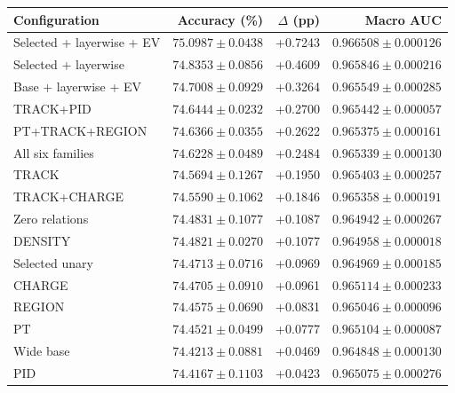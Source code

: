 \begin{table}[htbp]
\centering
\footnotesize
\setlength{\tabcolsep}{4pt}
\begin{tabularx}{\linewidth}{@{}Xrrr@{}}
\toprule
Configuration & Accuracy (\%) & $\Delta$ (pp) & Macro AUC \\
\midrule
Selected + layerwise + EV & $75.0987 \pm 0.0438$ & +0.7243 & $0.966508 \pm 0.000126$ \\ %
Selected + layerwise & $74.8353 \pm 0.0856$ & +0.4609 & $0.965846 \pm 0.000216$ \\ %
Base + layerwise + EV & $74.7008 \pm 0.0929$ & +0.3264 & $0.965549 \pm 0.000285$ \\ %
TRACK+PID & $74.6444 \pm 0.0232$ & +0.2700 & $0.965442 \pm 0.000057$ \\ %
PT+TRACK+REGION & $74.6366 \pm 0.0355$ & +0.2622 & $0.965375 \pm 0.000161$ \\ %
All six families & $74.6228 \pm 0.0489$ & +0.2484 & $0.965339 \pm 0.000130$ \\ %
TRACK & $74.5694 \pm 0.1267$ & +0.1950 & $0.965403 \pm 0.000257$ \\ %
TRACK+CHARGE & $74.5590 \pm 0.1062$ & +0.1846 & $0.965358 \pm 0.000191$ \\ %
Zero relations & $74.4831 \pm 0.1077$ & +0.1087 & $0.964942 \pm 0.000267$ \\ %
DENSITY & $74.4821 \pm 0.0270$ & +0.1077 & $0.964958 \pm 0.000018$ \\ %
Selected unary & $74.4713 \pm 0.0716$ & +0.0969 & $0.964969 \pm 0.000185$ \\ %
CHARGE & $74.4705 \pm 0.0910$ & +0.0961 & $0.965114 \pm 0.000233$ \\ %
REGION & $74.4575 \pm 0.0690$ & +0.0831 & $0.965046 \pm 0.000096$ \\ %
PT & $74.4521 \pm 0.0499$ & +0.0777 & $0.965104 \pm 0.000087$ \\ %
Wide base & $74.4213 \pm 0.0881$ & +0.0469 & $0.964848 \pm 0.000130$ \\ %
PID & $74.4167 \pm 0.1103$ & +0.0423 & $0.965075 \pm 0.000276$ \\ %

\end{tabularx}
\end{table}
